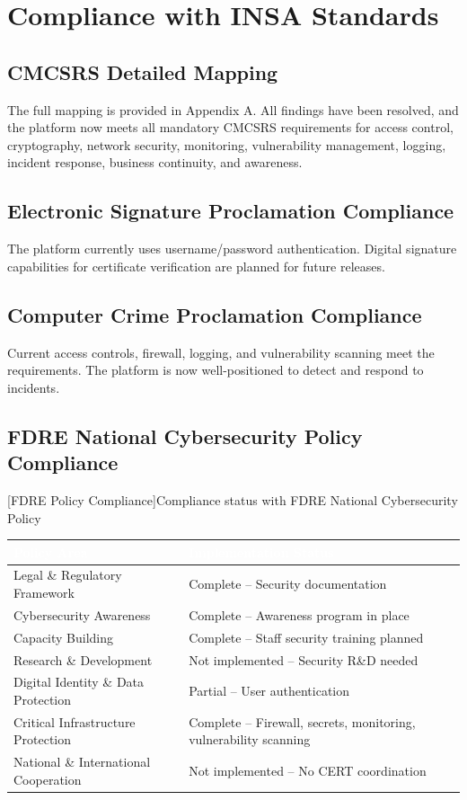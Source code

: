 \section{Compliance with INSA Standards}

\subsection{CMCSRS Detailed Mapping}
The full mapping is provided in Appendix A. All findings have been resolved, and the platform now meets all mandatory CMCSRS requirements for access control, cryptography, network security, monitoring, vulnerability management, logging, incident response, business continuity, and awareness.

\subsection{Electronic Signature Proclamation Compliance}
The platform currently uses username/password authentication. Digital signature capabilities for certificate verification are planned for future releases.

\subsection{Computer Crime Proclamation Compliance}
Current access controls, firewall, logging, and vulnerability scanning meet the requirements. The platform is now well-positioned to detect and respond to incidents.

\subsection{FDRE National Cybersecurity Policy Compliance}
\begin{center}
[FDRE Policy Compliance]{Compliance status with FDRE National Cybersecurity Policy}
\label{tab:fdre-policy}
\begin{tabular}{|p{}|p{}|}
\hline
\rowcolor{mooveblue}
\textcolor{white}{\textbf{Policy Area}} & \textcolor{white}{\textbf{Implementation Status}} \\
\hline
Legal \& Regulatory Framework & Complete – Security documentation \\
Cybersecurity Awareness & Complete – Awareness program in place \\
Capacity Building & Complete – Staff security training planned \\
Research \& Development & Not implemented – Security R\&D needed \\
Digital Identity \& Data Protection & Partial – User authentication \\
Critical Infrastructure Protection & Complete – Firewall, secrets, monitoring, vulnerability scanning \\
National \& International Cooperation & Not implemented – No CERT coordination \\
\hline
\end{tabular}
\end{center}


